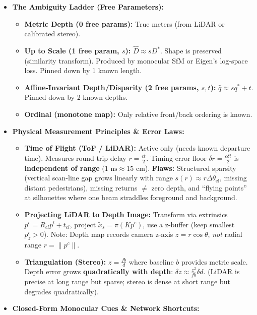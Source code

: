\documentclass[11pt,a4paper]{article}
\theoremstyle{definition}
\theoremstyle{plain}
\theoremstyle{remark}
\begin{document}
\begin{itemize}
    \item \textbf{The Ambiguity Ladder (Free Parameters):}
    \begin{itemize}
        \item \textbf{Metric Depth (0 free params):} True meters (from LiDAR or calibrated stereo).
        \item \textbf{Up to Scale (1 free param, $s$):} $\hat{D} \approx s D^*$. Shape is preserved (similarity transform). Produced by monocular SfM or Eigen's log-space loss. Pinned down by 1 known length.
        \item \textbf{Affine-Invariant Depth/Disparity (2 free params, $s, t$):} $\hat{q} \approx s q^* + t$. Pinned down by 2 known depths.
        \item \textbf{Ordinal (monotone map):} Only relative front/back ordering is known.
    \end{itemize}
    \item \textbf{Physical Measurement Principles \& Error Laws:}
    \begin{itemize}
        \item \textbf{Time of Flight (ToF / LiDAR):} Active only (needs known departure time). Measures round-trip delay $r = \frac{ct}{2}$. Timing error floor $\delta r = \frac{c\delta t}{2}$ is \textbf{independent of range} ($1\text{ ns} \approx 15\text{ cm}$). \textbf{Flaws:} Structured sparsity (vertical scan-line gap grows linearly with range $s(r) \approx r\Delta\theta_{\text{el}}$, missing distant pedestrians), missing returns $\neq$ zero depth, and ``flying points'' at silhouettes where one beam straddles foreground and background.
        \item \textbf{Projecting LiDAR to Depth Image:} Transform via extrinsics $p^c = R_{cl}p^l + t_{cl}$, project $\tilde{x}_s = \pi(Kp^c)$, use a z-buffer (keep smallest $p_z^c > 0$). Note: Depth map records camera z-axis $z = r\cos\theta$, \emph{not} radial range $r = \|p^c\|$.
        \item \textbf{Triangulation (Stereo):} $z = \frac{fb}{d}$ where baseline $b$ provides metric scale. Depth error grows \textbf{quadratically with depth}: $\delta z \approx \frac{z^2}{fb}\delta d$. (LiDAR is precise at long range but sparse; stereo is dense at short range but degrades quadratically).
    \end{itemize}
    \item \textbf{Closed-Form Monocular Cues \& Network Shortcuts:}
    \begin{itemize}

\end{itemize}
\end{itemize}
\end{document}
